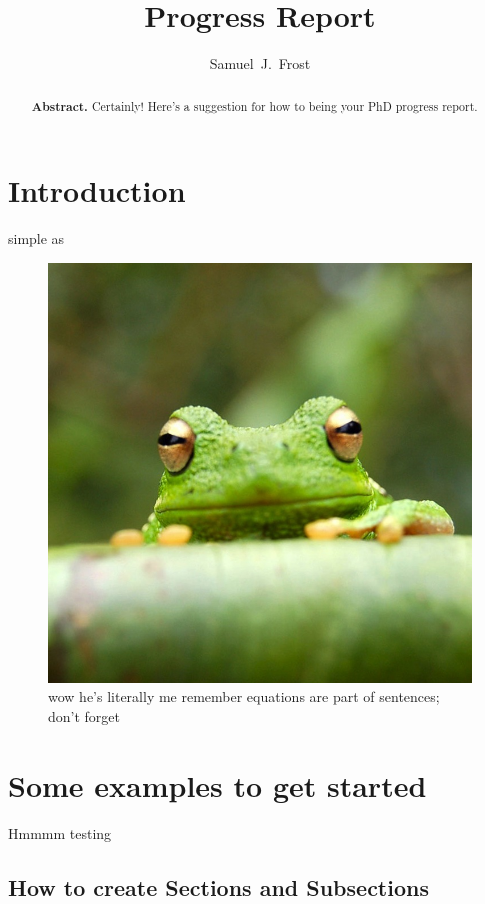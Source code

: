 \documentclass[conference,a4paper]{IEEEtran}
\title{Progress Report}
\author{Samuel~J.~Frost}
\begin{document}
\maketitle

\begin{abstract}
\textbf{Abstract.} Certainly! Here's a suggestion for how to being your PhD progress report. 
\end{abstract}

\section{Introduction}
simple as

\begin{figure}[htbp]
      \centering
      \includegraphics[width=0.25\linewidth]{frog.jpg}
      \caption{\label{fig:frog}wow he's literally me remember equations are part of sentences; don't forget}
      \end{figure}

\section{Some examples to get started}
Hmmmm testing


\subsection{How to create Sections and Subsections}

%
%
\end{document}
